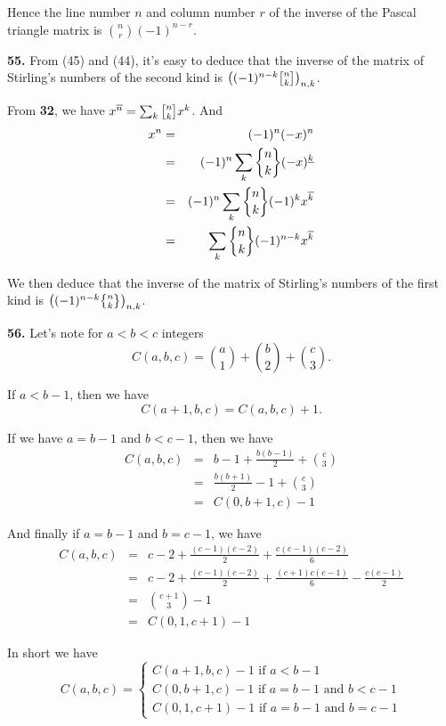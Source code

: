 \documentclass[a4paper,12pt]{article}
\newcommand{\newpar}[1]{\bigskip \noindent \textbf{#1.}}
\newcommand{\stirlingone}[2]{{#1 \atopwithdelims[]#2}}
\newcommand{\stirlingtwo}[2]{{#1 \atopwithdelims\{\}#2}}
\begin{document}
Hence the line number $n$ and column number $r$ of the inverse of the
Pascal triangle matrix is ${n \choose r} (-1)^{n-r}$.

\newpar{55} From (45) and (44), it's easy to deduce that the inverse
of the matrix of Stirling's numbers of the second kind is
$\left((-1)^{n-k}\stirlingone{n}{k}\right)_{n, k}$.

From \textbf{32}, we have $x^{\overline{n}} = \sum_k
\stirlingone{n}{k} x^k$. And
\begin{eqnarray*}
  x^n &=& (-1)^n (-x)^n \\
  &=& (-1)^n \sum_k \stirlingtwo{n}{k} (-x)^{\underline{k}} \\
  &=& (-1)^n \sum_k \stirlingtwo{n}{k} (-1)^k x^{\overline{k}} \\
  &=& \sum_k \stirlingtwo{n}{k}(-1)^{n-k} x^{\overline{k}}
\end{eqnarray*}

We then deduce that the inverse of the matrix of Stirling's numbers of
the first kind is $\left((-1)^{n-k}\stirlingtwo{n}{k}\right)_{n,k}$.

\newpar{56} Let's note for $a < b < c$ integers
\[ C(a, b, c) = {a \choose 1} + {b \choose 2} + {c \choose 3}.\]

If $a < b-1$, then we have
\[ C(a+1, b, c) = C(a, b, c) + 1.\]

If we have $a = b-1$ and $b < c-1$, then we have
\begin{eqnarray*}
  C(a, b, c) &=& b-1 + \frac{b(b-1)}{2} + {c \choose 3} \\
  &=& \frac{b(b+1)}{2} - 1 + {c \choose 3} \\
  &=& C(0, b+1, c) - 1
\end{eqnarray*}

And finally if $a = b-1$ and $b = c-1$, we have
\begin{eqnarray*}
  C(a, b, c) &=& c-2 + \frac{(c-1)(c-2)}{2} + \frac{c(c-1)(c-2)}{6} \\
  &=& c-2 + \frac{(c-1)(c-2)}{2} + \frac{(c+1)c(c-1)}{6} -
  \frac{c(c-1)}{2} \\
  &=& {c+1 \choose 3} - 1 \\
  &=& C(0, 1, c+1) - 1
\end{eqnarray*}

In short we have
\[
C(a, b, c) = \left\{
\begin{array}{l}
  C(a+1, b, c)-1\mbox{ if $a<b-1$} \\
  C(0, b+1, c)-1\mbox{ if $a=b-1$ and $b<c-1$} \\
  C(0, 1, c+1)-1\mbox{ if $a=b-1$ and $b=c-1$}
\end{array}
\right.
\]
\end{document}
